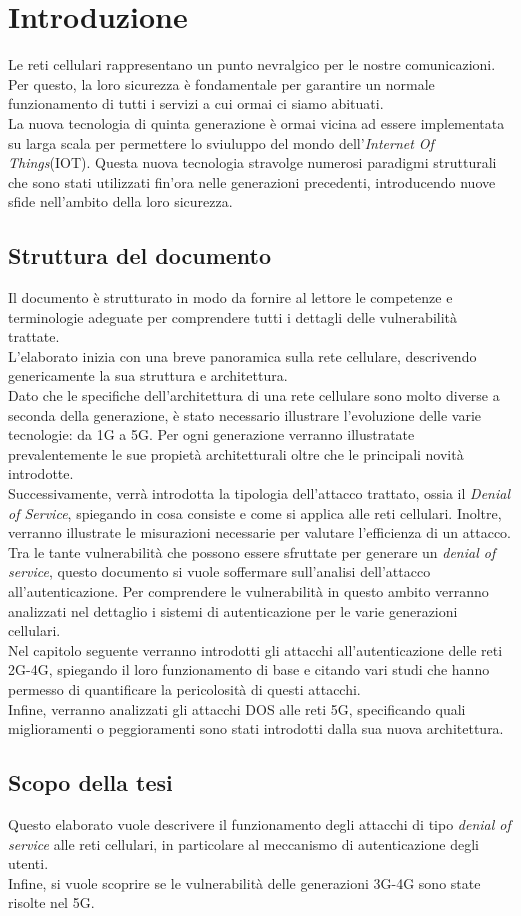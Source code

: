 \chapter{Introduzione}
Le reti cellulari rappresentano un punto nevralgico per le nostre comunicazioni.
Per questo, la loro sicurezza è fondamentale per garantire un normale funzionamento
di tutti i servizi a cui ormai ci siamo abituati.\\
La nuova tecnologia di quinta generazione è ormai vicina ad essere implementata su larga scala
per permettere lo sviuluppo del mondo dell'\textit{Internet Of Things}(IOT). Questa nuova tecnologia stravolge numerosi
paradigmi strutturali che sono stati utilizzati fin'ora nelle generazioni precedenti, introducendo nuove sfide nell'ambito
della loro sicurezza.
\section{Struttura del documento}
Il documento è strutturato in modo da fornire al lettore le competenze e terminologie adeguate per comprendere tutti i dettagli delle 
vulnerabilità trattate.\\
L'elaborato inizia con una breve panoramica sulla rete cellulare, descrivendo genericamente la sua struttura e architettura.\\ 
Dato che le specifiche dell'architettura di una rete cellulare sono molto diverse a seconda della generazione, è stato 
necessario illustrare l'evoluzione delle varie tecnologie: da 1G a 5G. 
Per ogni generazione verranno illustratate prevalentemente le sue propietà architetturali oltre che le principali novità introdotte.\\
Successivamente, verrà introdotta la tipologia dell'attacco trattato, ossia il \textit{Denial of Service}, spiegando in cosa consiste
e come si applica alle reti cellulari. Inoltre, verranno illustrate le misurazioni necessarie per valutare l'efficienza di un attacco.\\
Tra le tante vulnerabilità che possono essere sfruttate per generare un \textit{denial of service}, questo documento si vuole soffermare sull'analisi 
dell'attacco all'autenticazione.
Per comprendere le vulnerabilità in questo ambito verranno analizzati nel dettaglio i sistemi di autenticazione per le varie generazioni cellulari.\\
Nel capitolo seguente verranno introdotti gli attacchi all'autenticazione delle reti 2G-4G, spiegando il loro funzionamento di base e citando vari studi che 
hanno permesso di quantificare la pericolosità di questi attacchi.\\
Infine, verranno analizzati gli attacchi DOS alle reti 5G, specificando quali miglioramenti o peggioramenti sono stati introdotti dalla sua nuova architettura.
\section{Scopo della tesi}
Questo elaborato vuole descrivere il funzionamento degli attacchi di tipo \textit{denial of service} alle reti cellulari, in particolare al meccanismo 
di autenticazione degli utenti.\\
Infine, si vuole scoprire se le vulnerabilità delle generazioni 3G-4G sono state risolte nel 5G.